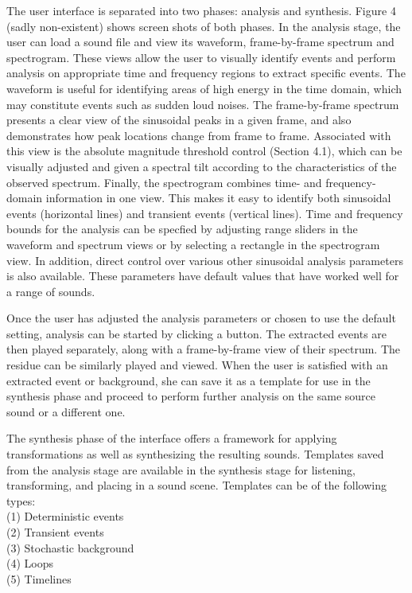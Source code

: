 \documentclass{acmsiggraph}               %
\begin{document}
The user interface is separated into two phases: analysis and synthesis. Figure 4 (sadly non-existent) 
shows screen shots of both phases. In the analysis stage, the user can load a sound file and view its waveform, frame-by-frame spectrum and spectrogram. These views allow the user to visually identify events and perform analysis on appropriate time and frequency regions to extract specific events. The waveform is useful for identifying areas of high energy in the time domain, which may constitute events such as sudden loud noises. The frame-by-frame spectrum presents a clear view of the sinusoidal peaks in a given frame, and also demonstrates how peak locations change from frame to frame. Associated with this view is the absolute magnitude threshold control (Section 4.1), which can be visually adjusted and given a spectral tilt according to the characteristics of the observed spectrum. Finally, the spectrogram combines time- and frequency-domain information in one view. This makes it easy to identify both sinusoidal events (horizontal lines) and transient events (vertical lines). Time and frequency bounds for the analysis can be specfied by adjusting range sliders in the waveform and spectrum views or by selecting a rectangle in the spectrogram view. In addition, direct control over various other sinusoidal analysis parameters is also available. These parameters have default values that have worked well for a range of sounds. 

Once the user has adjusted the analysis parameters or chosen to use the default setting, analysis can be started by clicking a button. The extracted events are then played separately, along with a frame-by-frame view of their spectrum. The residue can be similarly played and viewed. When the user is satisfied with an extracted event or background, she can save it as a template for use in the synthesis phase and proceed to perform further analysis on the same source sound or a different one.

The synthesis phase of the interface offers a framework for applying transformations as well as synthesizing the resulting sounds. Templates saved from the analysis stage are available in the synthesis stage for listening, transforming, and placing in a sound scene. Templates can be of the following types:\\
(1) Deterministic events\\
(2) Transient events\\
(3) Stochastic background\\
(4) Loops\\
(5) Timelines
\end{document}
